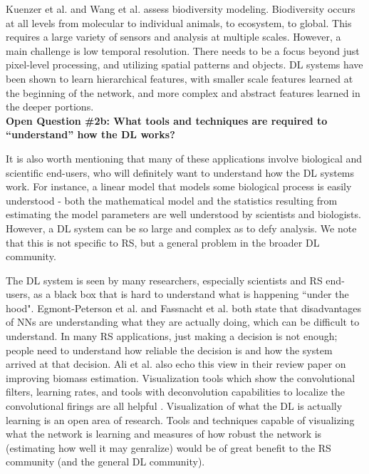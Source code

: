\documentclass[12pt]{spieman}
\newcommand{\ParSection}[1]{}
\begin{document}
\begin{spacing}{1}
Kuenzer et al. \cite{kuenzer2014earth} and Wang et al. \cite{wang2010remote} assess biodiversity modeling. Biodiversity occurs at all levels from molecular to individual animals, to ecosystem, to global. This requires a large variety of sensors and analysis at multiple scales. However, a main challenge is low temporal resolution. There needs to be a focus beyond just pixel-level processing, and utilizing spatial patterns and objects. DL systems have been shown to learn hierarchical features, with smaller scale features learned at the beginning of the network, and more complex and abstract features learned in the deeper portions. \\

\textbf{Open Question \#2b: What tools and techniques are required to ``understand'' how the DL works?} 
\ParSection{Human Understandable}

It is also worth mentioning that many of these applications involve biological and scientific end-users, who will definitely want to understand how the DL systems work. For instance, a linear model that models some biological process is easily understood - both the mathematical model and the statistics resulting from estimating the model parameters are well understood by scientists and biologists. However, a DL system can be so large and complex as to defy analysis. We note that this is not specific to RS, but a general problem in the broader DL community.

The DL system is seen by many researchers, especially scientists and RS end-users, as a black box that is hard to understand what is happening ``under the hood". Egmont-Peterson et al. \cite{Egmont-Petersen2002} and Fassnacht et al. \cite{fassnacht2016review} both state that disadvantages of NNs are understanding what they are actually doing, which can be difficult to understand. In many RS applications, just making a decision is not enough; people need to understand how reliable the decision is and how the system arrived at that decision. Ali et al. \cite{Ali2015} also echo this view in their review paper on improving biomass estimation. Visualization tools which show the convolutional filters, learning rates, and tools with deconvolution capabilities to localize the convolutional firings are all helpful \cite{mahendran2015understanding, yosinski2015understanding, zeiler2014visualizing, simonyan2013deep, erhan2009visualizing} . Visualization of what the DL is actually learning is an open area of research. Tools and techniques capable of visualizing what the network is learning and measures of how robust the network is (estimating how well it may genralize) would be of great benefit to the RS community (and the general DL community).



\end{spacing}
\end{document}
